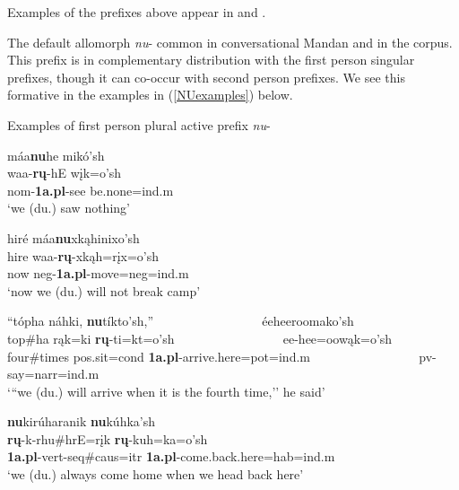 Examples of the prefixes above appear in  and .

\label{Para1PLA}

The default allomorph \textit{nu}- common in conversational Mandan and in the corpus. This prefix is in complementary distribution with the first person singular prefixes, though it can co-occur with second person prefixes. We see this formative in the examples in (\ref{NUexamples}) below.

\begin{exe}

\item\label{NUexamples} Examples of first person plural active prefix \textit{nu}-
	
	\begin{xlist}
	
	\item \glll máa\textbf{nu}he mikó'sh\\
	waa-\textbf{rų}-hE wįk=o'sh\\
	nom-\textbf{1a.pl}-\textnormal{see} \textnormal{be.none}=ind.m\\
	\glt `we (du.) saw nothing' \citep[186]{hollow1973b}
	
	\item \glll hiré máa\textbf{nu}xkąhinixo'sh\\
	hire waa-\textbf{rų}-xkąh=rįx=o'sh\\
	\textnormal{now} neg-\textbf{1a.pl}-\textnormal{move}=neg=ind.m\\
	\glt `now we (du.) will not break camp' \citep[195]{hollow1973b}
	
	\item \glll ``tópha náhki, \textbf{nu}tíkto'sh,'' ~ ~ ~ ~ ~ ~ ~ ~ ~ ~ éeheeroomako'sh\\
	top\#ha rąk=ki \textbf{rų}-ti=kt=o'sh ~ ~ ~ ~ ~ ~ ~ ~ ~ ~ ee-hee=oowąk=o'sh\\
	\textnormal{four}\#\textnormal{times} pos.sit=cond \textbf{1a.pl}-\textnormal{arrive.here}=pot=ind.m ~ ~ ~ ~ ~ ~ ~ ~ ~ ~ pv-\textnormal{say}=narr=ind.m\\
	\glt `{``}we (du.) will arrive when it is the fourth time,'' he said' \citep[243]{hollow1973b}
	
	\item \glll \textbf{nu}kirúharanik \textbf{nu}kúhka'sh\\
	\textbf{rų}-k-rhu\#hrE=rįk \textbf{rų}-kuh=ka=o'sh\\
	\textbf{1a.pl}-vert-seq\#caus=itr \textbf{1a.pl}-\textnormal{come.back.here}=hab=ind.m\\
	\glt `we (du.) always come home when we head back here' \citep[151]{hollow1973b}
	

\end{xlist}
\end{exe}
